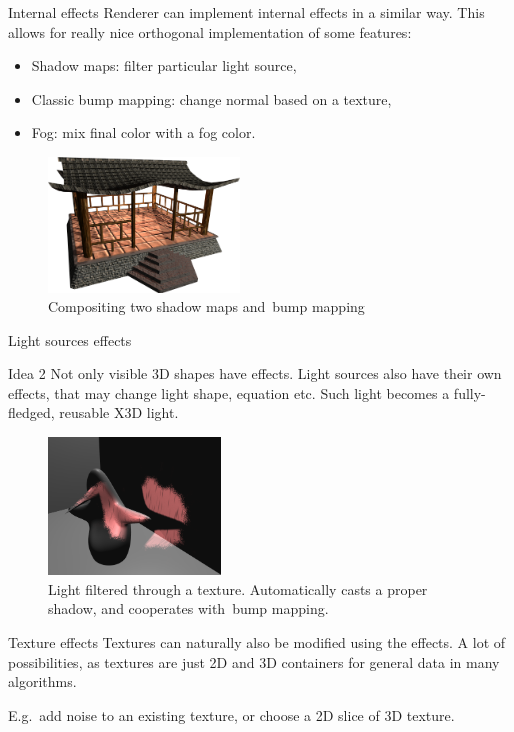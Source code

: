 \documentclass{beamer}
\begin{document}
\begin{frame}{Internal effects}
Renderer can implement internal effects in a similar way.
This allows for really nice orthogonal implementation
of some features:

\begin{itemize}
  \item Shadow maps: filter particular light source,
  \item Classic bump mapping: change normal based on a texture,
  \item Fog: mix final color with a fog color.
\end{itemize}

\begin{figure}
  \centering
  \includegraphics[width=2in]{../rhan_shrine_5_everything}
  \caption{Compositing two shadow maps and~bump mapping}
\end{figure}
\end{frame}

\begin{frame}{Light sources effects}
\begin{block}{Idea 2}
Not only visible 3D shapes have effects.
Light sources also have their own effects, that may change light
shape, equation etc. Such light becomes a fully-fledged, reusable X3D light.
\end{block}

\begin{figure}
  \centering
  \includegraphics[width=1.8in]{../fancy_light_spot_shape}
  \caption{Light filtered through a texture. Automatically casts a proper shadow, and cooperates with~bump mapping.}
\end{figure}
\end{frame}

\begin{frame}[fragile]{Texture effects}
Textures can naturally also be modified using the effects.
A lot of possibilities, as textures are just 2D and 3D containers for general data
in many algorithms.

\vspace{0.1in}

E.g.~add noise to an existing texture, or choose a 2D slice of 3D texture.
\end{frame}
\end{document}
